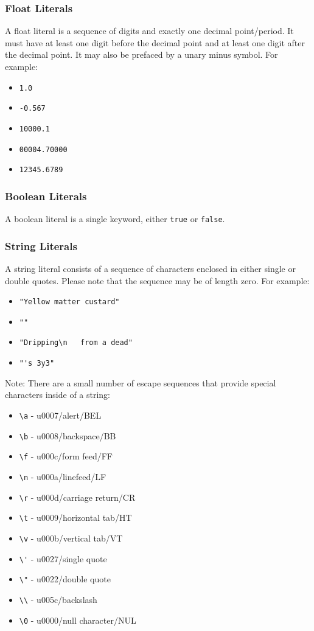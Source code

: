 \subsubsection{Float Literals}
A float literal is a sequence of digits and exactly one decimal point/period. It must have at least one digit before the decimal point and at least one digit after the decimal point. It may also be prefaced by a unary minus symbol. For example:
\begin{itemize}
\item \verb!1.0!
\item \verb!-0.567!
\item \verb!10000.1!
\item \verb!00004.70000!
\item \verb!12345.6789!
\end{itemize}

\subsubsection{Boolean Literals}
A boolean literal is a single keyword, either \verb!true! or \verb!false!.

\subsubsection{String Literals}
A string literal consists of a sequence of characters enclosed in either single or double quotes. Please note that the sequence may be of length zero. For example:
\begin{itemize}
\item \verb!"Yellow matter custard"!
\item \verb!""!
\item \verb!"Dripping\n   from a dead"!
\item \verb!"'s 3y3"!
\end{itemize}

Note: There are a small number of escape sequences that provide special characters inside of a string:
\begin{itemize}
\item \verb!\a! - u0007/alert/BEL
\item \verb!\b! - u0008/backspace/BB
\item \verb!\f! - u000c/form feed/FF
\item \verb!\n! - u000a/linefeed/LF
\item \verb!\r! - u000d/carriage return/CR
\item \verb!\t! - u0009/horizontal tab/HT
\item \verb!\v! - u000b/vertical tab/VT
\item \verb!\'! - u0027/single quote
\item \verb!\"! - u0022/double quote
\item \verb!\\! - u005c/backslash
\item \verb!\0! - u0000/null character/NUL 
\end{itemize}

